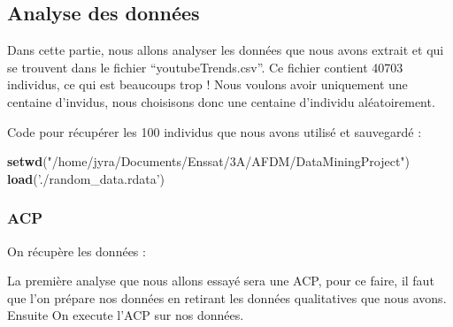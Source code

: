 \documentclass[
]{article}
\newenvironment{Shaded}{\begin{snugshade}}{\end{snugshade}}
\newcommand{\CommentTok}[1]{\textcolor[rgb]{0.56,0.35,0.01}{\textit{#1}}}
\newcommand{\DataTypeTok}[1]{\textcolor[rgb]{0.13,0.29,0.53}{#1}}
\newcommand{\DecValTok}[1]{\textcolor[rgb]{0.00,0.00,0.81}{#1}}
\newcommand{\KeywordTok}[1]{\textcolor[rgb]{0.13,0.29,0.53}{\textbf{#1}}}
\newcommand{\NormalTok}[1]{#1}
\newcommand{\OperatorTok}[1]{\textcolor[rgb]{0.81,0.36,0.00}{\textbf{#1}}}
\newcommand{\OtherTok}[1]{\textcolor[rgb]{0.56,0.35,0.01}{#1}}
\newcommand{\StringTok}[1]{\textcolor[rgb]{0.31,0.60,0.02}{#1}}
\begin{document}
\hypertarget{analyse-des-donnuxe9es}{%
\subsection{Analyse des données}\label{analyse-des-donnuxe9es}}

Dans cette partie, nous allons analyser les données que nous avons
extrait et qui se trouvent dans le fichier ``youtubeTrends.csv''. Ce
fichier contient 40703 individus, ce qui est beaucoups trop ! Nous
voulons avoir uniquement une centaine d'invidus, nous choisisons donc
une centaine d'individu aléatoirement.

Code pour récupérer les 100 individus que nous avons utilisé et
sauvegardé :

\begin{Shaded}
\begin{Highlighting}[]
\KeywordTok{setwd}\NormalTok{(}\StringTok{"/home/jyra/Documents/Enssat/3A/AFDM/DataMiningProject"}\NormalTok{)}
\KeywordTok{load}\NormalTok{(}\StringTok{'./random_data.rdata'}\NormalTok{)}
\end{Highlighting}
\end{Shaded}

\hypertarget{acp}{%
\subsubsection{ACP}\label{acp}}

On récupère les données :

La première analyse que nous allons essayé sera une ACP, pour ce faire,
il faut que l'on prépare nos données en retirant les données
qualitatives que nous avons. Ensuite On execute l'ACP sur nos données.

\begin{Shaded}
\end{Shaded}
\end{document}
